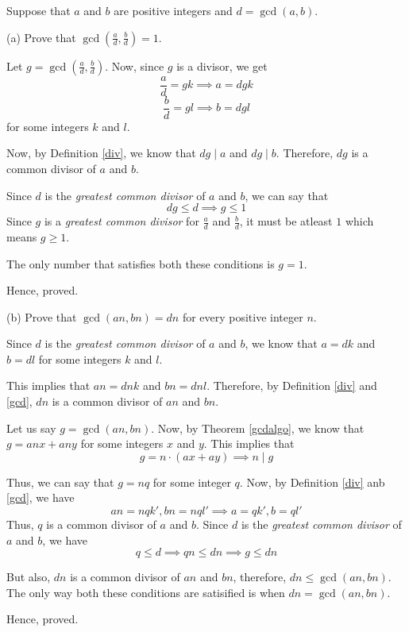 \begin{problem}
	Suppose that $a$ and $b$ are positive integers and $d = \gcd(a, b)$.

	\bigbreak
	(a) Prove that $\gcd(\frac{a}{d}, \frac{b}{d}) = 1$.
	\begin{solution}
		Let $g = \gcd(\frac{a}{d}, \frac{b}{d})$. Now, since $g$ is a divisor, we get
		$$\frac{a}{d} = gk \implies a = dgk$$
		$$\frac{b}{d} = gl \implies b = dgl$$
		for some integers $k$ and $l$.

		Now, by Definition \ref{div}, we know that $dg \mid a$ and $dg \mid b$. Therefore, $dg$ is a common divisor of $a$ and $b$.

		Since $d$ is the \emph{greatest common divisor} of $a$ and $b$, we can say that 
		$$dg \leq d \implies g \leq 1$$
		Since $g$ is a \emph{greatest common divisor} for $\frac{a}{d}$ and $\frac{b}{d}$, it must be atleast $1$ which means $g \geq 1$.

		The only number that satisfies both these conditions is $g = 1$.

		Hence, proved.
	\end{solution}

	(b) Prove that $\gcd(an, bn) = dn$ for every positive integer $n$.
	\begin{solution}
		Since $d$ is the \emph{greatest common divisor} of $a$ and $b$, we know that $a = dk$ and $b = dl$ for some integers $k$ and $l$.
		
		This implies that $an = dnk$ and $bn = dnl$. Therefore, by Definition \ref{div} and \ref{gcd}, $dn$ is a common divisor of $an$ and $bn$.

		Let us say $g = \gcd(an,bn)$. Now, by Theorem \ref{gcdalgo}, we know that $g = anx + any$ for some integers $x$ and $y$.
		This implies that $$g = n \cdot (ax + ay) \implies n \mid g$$

		Thus, we can say that $g = nq$ for some integer $q$. Now, by Definition \ref{div} anb \ref{gcd}, we have
		$$an = nqk', bn = nql' \implies a = qk', b = ql'$$
		Thus, $q$ is a common divisor of $a$ and $b$. Since $d$ is the \emph{greatest common divisor} of $a$ and $b$, we have
		$$q \leq d \implies qn \leq dn \implies g \leq dn$$

		But also, $dn$ is a common divisor of $an$ and $bn$, therefore, $dn \leq \gcd(an, bn)$. \\
		The only way both these conditions are satisified is when $dn = \gcd(an, bn)$.

		Hence, proved.
	\end{solution}
\end{problem}


